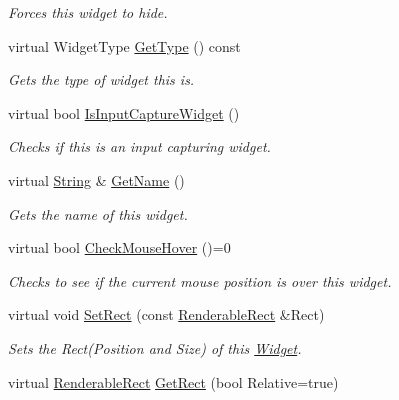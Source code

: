 \begin{DoxyCompactItemize}
\begin{DoxyCompactList}\small\item\em Forces this widget to hide. \item\end{DoxyCompactList}\item 
virtual WidgetType \hyperlink{classphys_1_1UI_1_1Widget_a76337b279bd372ce225f94ab1da191ea}{GetType} () const 
\begin{DoxyCompactList}\small\item\em Gets the type of widget this is. \item\end{DoxyCompactList}\item 
virtual bool \hyperlink{classphys_1_1UI_1_1Widget_af8498cbe2d6cf37115cf8ade52e22557}{IsInputCaptureWidget} ()
\begin{DoxyCompactList}\small\item\em Checks if this is an input capturing widget. \item\end{DoxyCompactList}\item 
virtual \hyperlink{namespacephys_aa03900411993de7fbfec4789bc1d392e}{String} \& \hyperlink{classphys_1_1UI_1_1Widget_a35d6e7ce60a9b295d8659345627cf7e0}{GetName} ()
\begin{DoxyCompactList}\small\item\em Gets the name of this widget. \item\end{DoxyCompactList}\item 
virtual bool \hyperlink{classphys_1_1UI_1_1Widget_a613df6dbb42efe139d185043a00259dc}{CheckMouseHover} ()=0
\begin{DoxyCompactList}\small\item\em Checks to see if the current mouse position is over this widget. \item\end{DoxyCompactList}\item 
virtual void \hyperlink{classphys_1_1UI_1_1Widget_a5ef3d6feab24fd891b17780069e012e5}{SetRect} (const \hyperlink{structphys_1_1UI_1_1RenderableRect}{RenderableRect} \&Rect)
\begin{DoxyCompactList}\small\item\em Sets the Rect(Position and Size) of this \hyperlink{classphys_1_1UI_1_1Widget}{Widget}. \item\end{DoxyCompactList}\item 
virtual \hyperlink{structphys_1_1UI_1_1RenderableRect}{RenderableRect} \hyperlink{classphys_1_1UI_1_1Widget_a0a09859c063ac222d0e736af5050e556}{GetRect} (bool Relative=true)

\end{DoxyCompactItemize}
